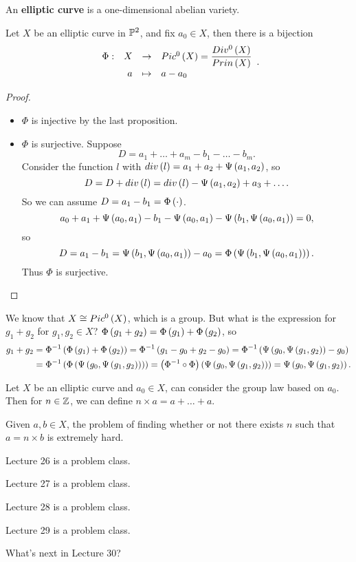 \begin{definition}
An \textbf{elliptic curve} is a one-dimensional abelian variety.
\end{definition}

\begin{proposition}
Let $ X $ be an elliptic curve in $ \P^2 $, and fix $ a_0 \in X $, then there is a bijection
$$ \function[\Phi]{X}{Pic^0\rb{X} = \dfrac{Div^0\rb{X}}{Prin\rb{X}}}{a}{a - a_0}. $$
\end{proposition}

\begin{proof}
\hfill
\begin{itemize}
\item $ \Phi $ is injective by the last proposition.
\item $ \Phi $ is surjective. Suppose
$$ D = a_1 + \dots + a_m - b_1 - \dots - b_m. $$
Consider the function $ l $ with $ div\rb{l} = a_1 + a_2 + \Psi\rb{a_1, a_2} $, so
$$ D = D + div\rb{l} = div\rb{l} - \Psi\rb{a_1, a_2} + a_3 + \dots. $$
So we can assume $ D = a_1 - b_1 = \Phi\rb{\cdot} $.
$$ a_0 + a_1 + \Psi\rb{a_0, a_1} - b_1 - \Psi\rb{a_0, a_1} - \Psi\rb{b_1, \Psi\rb{a_0, a_1}} = 0, $$
so
$$ D = a_1 - b_1 = \Psi\rb{b_1, \Psi\rb{a_0, a_1}} - a_0 = \Phi\rb{\Psi\rb{b_1, \Psi\rb{a_0, a_1}}}. $$
Thus $ \Phi $ is surjective.
\end{itemize}
\end{proof}

We know that $ X \cong Pic^0\rb{X} $, which is a group. But what is the expression for $ g_1 + g_2 $ for $ g_1, g_2 \in X $? $ \Phi\rb{g_1 + g_2} = \Phi\rb{g_1} + \Phi\rb{g_2} $, so
\begin{align*}
g_1 + g_2
& = \Phi^{-1}\rb{\Phi\rb{g_1} + \Phi\rb{g_2}} = \Phi^{-1}\rb{g_1 - g_0 + g_2 - g_0} = \Phi^{-1}\rb{\Psi\rb{g_0, \Psi\rb{g_1, g_2}} - g_0} \\
& = \Phi^{-1}\rb{\Phi\rb{\Psi\rb{g_0, \Psi\rb{g_1, g_2}}}} = \rb{\Phi^{-1} \circ \Phi}\rb{\Psi\rb{g_0, \Psi\rb{g_1, g_2}}} = \Psi\rb{g_0, \Psi\rb{g_1, g_2}}.
\end{align*}

Let $ X $ be an elliptic curve and $ a_0 \in X $, can consider the group law based on $ a_0 $. Then for $ n \in \Z $, we can define $ n \times a = a + \dots + a $.

\begin{note*}
Given $ a, b \in X $, the problem of finding whether or not there exists $ n $ such that $ a = n \times b $ is extremely hard.
\end{note*}


Lecture 26 is a problem class.


Lecture 27 is a problem class.


Lecture 28 is a problem class.


Lecture 29 is a problem class.


What's next in Lecture 30?

